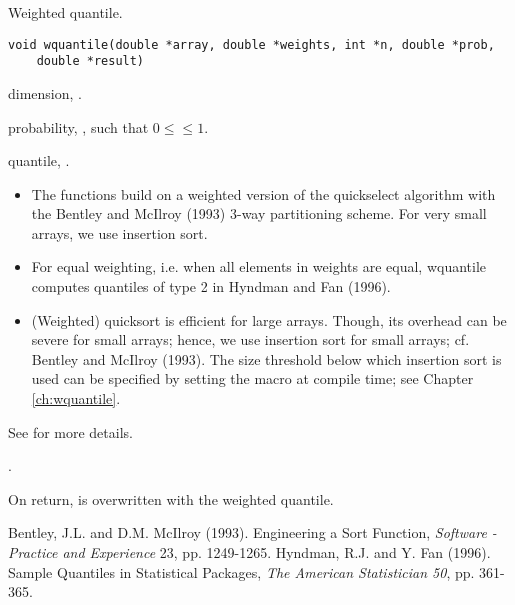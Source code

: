 \documentclass[a4paper,oneside,10pt,DIV=12]{scrreprt}
\begin{document}
\begin{Description}
Weighted quantile.
\end{Description}
\begin{Usage}
\begin{verbatim}
void wquantile(double *array, double *weights, int *n, double *prob, 
    double *result)
\end{verbatim}
\end{Usage}
\begin{Arguments}
	\begin{ldescription}
		\item[\code{n}] dimension, . 
		\item[\code{prob}] probability, , such that 
			$0 \leq$$\leq 1$. 
		\item[\code{result}] quantile, . 
	\end{ldescription}
\end{Arguments}
\begin{Details}
	\begin{itemize}
	\item The functions build on a weighted version of the quickselect 
		algorithm with the Bentley and McIlroy (1993) 3-way partitioning scheme. 
		For very small arrays, we use insertion sort.
	\item For equal weighting, i.e. when all elements in weights are equal, 
		wquantile computes quantiles of type 2 in Hyndman and Fan (1996).
	\item (Weighted) quicksort is efficient for large arrays. Though, its 
		overhead can be severe for small arrays; hence, we use insertion sort 
		for small arrays; cf. Bentley and McIlroy (1993). The size threshold 
		below which insertion sort is used can be specified by setting the 
		macro  at compile time; see Chapter
		\ref{ch:wquantile}. 
	\end{itemize}

See  for more details.
\end{Details}
\begin{Dependency}
	.	
\end{Dependency}
\begin{Value}
On return,  is overwritten with the weighted quantile.
\end{Value}
\begin{References}\relax
Bentley, J.L. and D.M. McIlroy (1993). Engineering a Sort Function, 
	\textit{Software - Practice and Experience} 23, pp. 1249-1265.
Hyndman, R.J. and Y. Fan (1996). Sample Quantiles in Statistical Packages, 
	\textit{The American Statistician 50}, pp. 361-365. 
\end{References}
\end{document}
